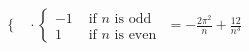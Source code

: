 \documentclass[11pt]{article}
\begin{document}
\begin{solution}
\begin{itemize}
\begin{align*}
\begin{cases}
            \end{cases}\cdot \left\{\begin{array}{ll} -1 & \text{ if $n$ is odd } \\ 1 & \text{ if $n$ is even } \end{array}\right. =  -\frac{2\pi^2}{n}+\frac{12}{n^3}
    \end{align*}
% 
% 

\end{itemize}
\end{solution}
\end{document}
